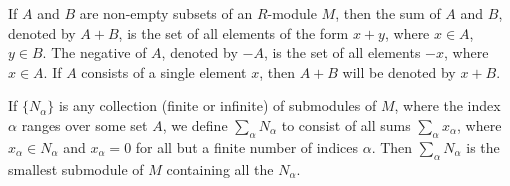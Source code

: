 If $A$ and $B$ are non-empty subsets of an $R$-module $M$, then the sum of $A$ and $B$, denoted by $A + B$, is the set of all elements of the form $x + y$, where $x \in A$, $y \in B$. The negative of $A$, denoted by $-A$, is the set of all elements $-x$, where $x \in A$. If $A$ consists of a single element $x$, then $A + B$ will be denoted by $x + B$.

If $\{N_\alpha\}$ is any collection (finite or infinite) of submodules of $M$, where the index $\alpha$ ranges over some set $A$, we define $\sum_\alpha N_\alpha$ to consist of all sums $\sum_\alpha x_\alpha$, where $x_\alpha \in N_\alpha$ and $x_\alpha = 0$ for all but a finite number of indices $\alpha$. Then $\sum_\alpha N_\alpha$ is the smallest submodule of $M$ containing all the $N_\alpha$.
